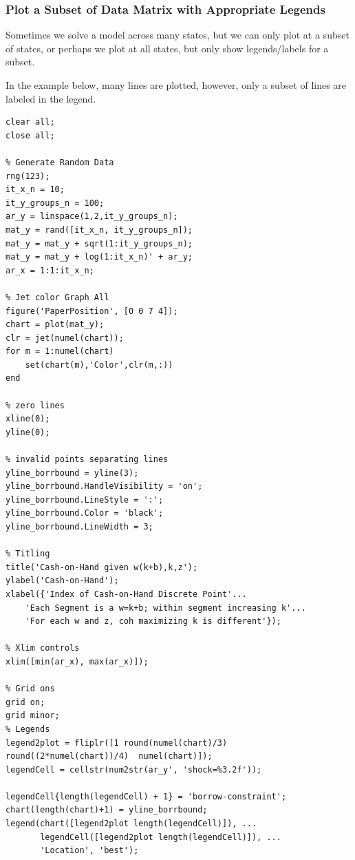 \documentclass[
]{book}
\begin{document}
\hypertarget{plot-a-subset-of-data-matrix-with-appropriate-legends}{%
\subsubsection{Plot a Subset of Data Matrix with Appropriate Legends}\label{plot-a-subset-of-data-matrix-with-appropriate-legends}}

Sometimes we solve a model across many states, but we can only plot at a
subset of states, or perhaps we plot at all states, but only show
legends/labels for a subset.

In the example below, many lines are plotted, however, only a subset of
lines are labeled in the legend.

\begin{verbatim}
clear all;
close all;

% Generate Random Data
rng(123);
it_x_n = 10;
it_y_groups_n = 100;
ar_y = linspace(1,2,it_y_groups_n);
mat_y = rand([it_x_n, it_y_groups_n]);
mat_y = mat_y + sqrt(1:it_y_groups_n);
mat_y = mat_y + log(1:it_x_n)' + ar_y;
ar_x = 1:1:it_x_n;

% Jet color Graph All
figure('PaperPosition', [0 0 7 4]);
chart = plot(mat_y);
clr = jet(numel(chart));
for m = 1:numel(chart)
    set(chart(m),'Color',clr(m,:))
end

% zero lines
xline(0);
yline(0);

% invalid points separating lines
yline_borrbound = yline(3);
yline_borrbound.HandleVisibility = 'on';
yline_borrbound.LineStyle = ':';
yline_borrbound.Color = 'black';
yline_borrbound.LineWidth = 3;

% Titling
title('Cash-on-Hand given w(k+b),k,z');
ylabel('Cash-on-Hand');
xlabel({'Index of Cash-on-Hand Discrete Point'...
    'Each Segment is a w=k+b; within segment increasing k'...
    'For each w and z, coh maximizing k is different'});

% Xlim controls
xlim([min(ar_x), max(ar_x)]);

% Grid ons
grid on;
grid minor;
% Legends
legend2plot = fliplr([1 round(numel(chart)/3) round((2*numel(chart))/4)  numel(chart)]);
legendCell = cellstr(num2str(ar_y', 'shock=%3.2f'));

legendCell{length(legendCell) + 1} = 'borrow-constraint';
chart(length(chart)+1) = yline_borrbound;
legend(chart([legend2plot length(legendCell)]), ...
       legendCell([legend2plot length(legendCell)]), ...
       'Location', 'best');
\end{verbatim}
\end{document}
